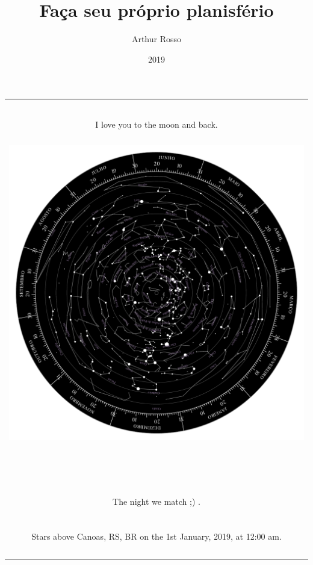 \documentclass{article}
\title{Faça seu próprio planisfério}
\author{Arthur Rosso}
\date{2019}
\begin{document}
\thispagestyle{empty}

\setlength{\arrayrulewidth}{3mm}
\begin{center}
{
\begin{tabular}{ |c|c|c|  }
\hline
\\ 
\\ 
\\ 
\multicolumn{3}{|c|}{
    \begin{LARGE}
    \centerline{I love you to the moon and back.}
    \end{LARGE}
} 
\\ 
\\ 
\multicolumn{3}{|c|}{
    \centerline{\includegraphics{tmp/starwheel}}
} 
\\
\\
\\
\\
\\
\\
\\
\\
\\
\\
\\
\\
\\ \hspace{19.27cm}
\\
\multicolumn{3}{|c|}{
    \begin{LARGE}
    \centerline{The night we match ;) .}
    \end{LARGE}
}
\\
\\
\multicolumn{3}{|c|}{
    \begin{large}
    \centerline{Stars above Canoas, RS, BR on the 1st January, 2019, at 12:00 am.}
    \end{large}
} 
\\
\\
\\
\hline
\end{tabular}
}
\end{center}
\end{document}
